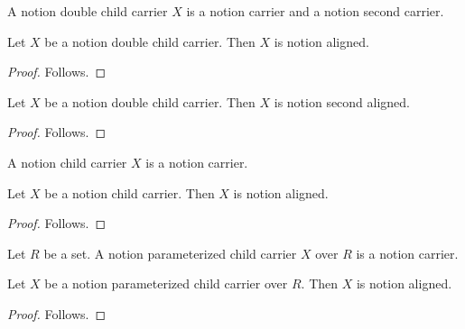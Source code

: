 \begin{struct}\label{notion_double_child_carrier}
    A notion double child carrier $X$ is a notion carrier and
        a notion second carrier.
\end{struct}

\begin{proposition}\label{notion_first_parent_view_use}
    Let $X$ be a notion double child carrier.
    Then $X$ is notion aligned.
\end{proposition}
\begin{proof}
    Follows.
\end{proof}

\begin{proposition}\label{notion_second_parent_view_use}
    Let $X$ be a notion double child carrier.
    Then $X$ is notion second aligned.
\end{proposition}
\begin{proof}
    Follows.
\end{proof}

\begin{struct}\label{notion_child_carrier}
    A notion child carrier $X$ is a notion carrier.
\end{struct}

\begin{proposition}\label{notion_structure_parent_view_use}
    Let $X$ be a notion child carrier.
    Then $X$ is notion aligned.
\end{proposition}
\begin{proof}
    Follows.
\end{proof}

\begin{struct}\label{notion_parameterized_child_carrier}
    Let $R$ be a set.
    A notion parameterized child carrier $X$ over $R$ is a notion carrier.
\end{struct}

\begin{proposition}\label{notion_structure_erasing_view_use}
    Let $X$ be a notion parameterized child carrier over $R$.
    Then $X$ is notion aligned.
\end{proposition}
\begin{proof}
    Follows.
\end{proof}
